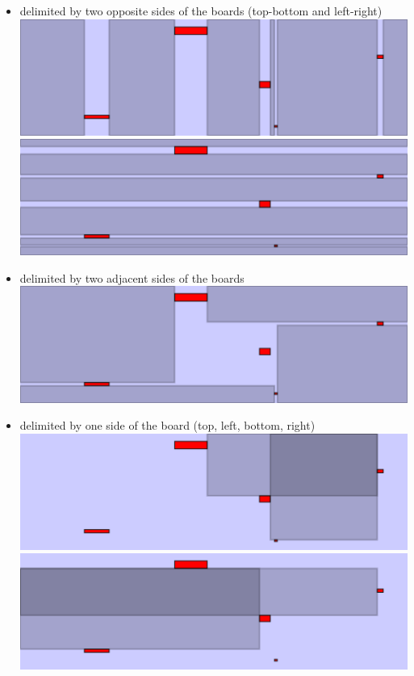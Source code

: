 \documentclass[
]{article}
\providecommand{\tightlist}{%
  \setlength{\itemsep}{0pt}\setlength{\parskip}{0pt}}
\begin{document}
\begin{itemize}
\tightlist
\item
  delimited by two opposite sides of the boards (top-bottom and
  left-right) \\
  \includegraphics{imgs/mers-1a.png}
  \includegraphics{imgs/mers-1b.png}
\item
  delimited by two adjacent sides of the boards \\
  \includegraphics{imgs/mers-2.png}
\item
  delimited by one side of the board (top, left, bottom, right) \\
  \includegraphics{imgs/mers-3a.png} \includegraphics{imgs/mers-3b.png}

\end{itemize}
\end{document}
